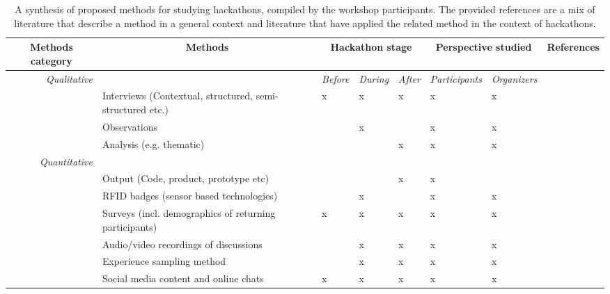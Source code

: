 \documentclass{ieeeaccess}
\begin{document}
\begin{table}[t]
\begin{tabular}{llllllll}
\hline
\multicolumn{1}{c}{\textbf{Methods category}} &
  \multicolumn{1}{c}{\textbf{Methods}} &
  \multicolumn{3}{c}{\textbf{Hackathon stage}} &
  \multicolumn{2}{c}{\textbf{Perspective studied}} &
  \multicolumn{1}{c}{\textbf{References}} \\ \hline
\multicolumn{1}{r}{\textit{Qualitative}} &
  \multicolumn{1}{l|}{} &
  \multicolumn{1}{c}{\textit{Before}} &
  \multicolumn{1}{c}{\textit{During}} &
  \multicolumn{1}{c|}{\textit{After}} &
  \multicolumn{1}{c}{\textit{Participants}} &
  \multicolumn{1}{c|}{\textit{Organizers}} &
   \\
 &
  \multicolumn{1}{l|}{Interviews (Contextual, structured, semi-structured etc.)} &
  x &
  x &
  \multicolumn{1}{l|}{x} &
  x &
  \multicolumn{1}{l|}{x} &
  \cite{kvale2012doing,beyer1999contextual} \\
 &
  \multicolumn{1}{l|}{Observations} &
   &
  x &
  \multicolumn{1}{l|}{} &
  x &
  \multicolumn{1}{l|}{x} &
  \cite{blomberg2017ethnographic} \\
 &
  \multicolumn{1}{l|}{Analysis (e.g. thematic)} &
   &
   &
  \multicolumn{1}{l|}{x} &
  x &
  \multicolumn{1}{l|}{x} &
  \cite{braun2012thematic} \\
\multicolumn{1}{r}{\textit{Quantitative}} &
  \multicolumn{1}{l|}{} &
   &
   &
  \multicolumn{1}{l|}{} &
   &
  \multicolumn{1}{l|}{} &
   \\
 &
  \multicolumn{1}{l|}{Output (Code, product, prototype etc)} &
   &
   &
  \multicolumn{1}{l|}{x} &
  x &
  \multicolumn{1}{l|}{} &
  \cite{nolte2020happens,imam2021secret} \\
 &
  \multicolumn{1}{l|}{RFID badges (sensor based technologies)} &
   &
  x &
  \multicolumn{1}{l|}{} &
  x &
  \multicolumn{1}{l|}{x} &
  \cite{pentland2008honest, lederman2017open} \\
 &
  \multicolumn{1}{l|}{Surveys (incl. demographics of returning participants)} &
  x &
  x &
  \multicolumn{1}{l|}{x} &
  x &
  \multicolumn{1}{l|}{x} &
  \cite{rea2014designing} \\
 &
  \multicolumn{1}{l|}{Audio/video recordings of discussions} &
   &
  x &
  \multicolumn{1}{l|}{x} &
  x &
  \multicolumn{1}{l|}{x} &
  \cite{olesen2018four} \\
 &
  \multicolumn{1}{l|}{Experience sampling method} &
   &
  x &
  \multicolumn{1}{l|}{x} &
  x &
  \multicolumn{1}{l|}{x} &
  \cite{larson2014experience} \\
 &
  \multicolumn{1}{l|}{Social media content and online chats} &
  x &
  x &
  \multicolumn{1}{l|}{x} &
  x &
  \multicolumn{1}{l|}{x} &
  \cite{bontcheva2016extracting} \\ \hline
\end{tabular}%

\caption{A synthesis of proposed methods for studying hackathons, compiled by the workshop participants. The provided references are a mix of literature that describe a method in a general context and literature that have applied the related method in the context of hackathons.}
\label{tab:methods}
\end{table}
\end{document}
